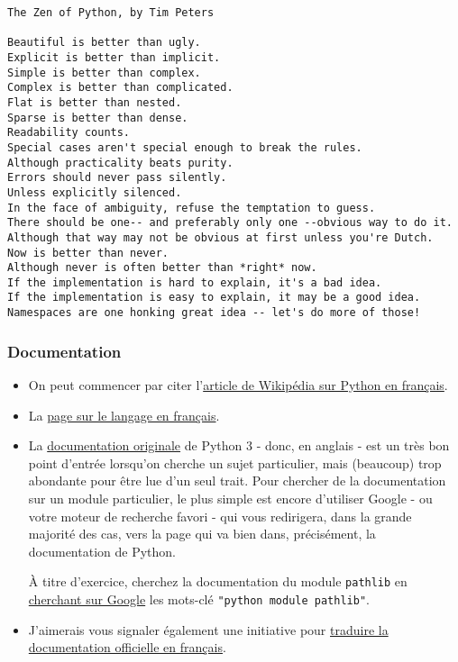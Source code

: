     \begin{Verbatim}[commandchars=\\\{\}]
The Zen of Python, by Tim Peters

Beautiful is better than ugly.
Explicit is better than implicit.
Simple is better than complex.
Complex is better than complicated.
Flat is better than nested.
Sparse is better than dense.
Readability counts.
Special cases aren't special enough to break the rules.
Although practicality beats purity.
Errors should never pass silently.
Unless explicitly silenced.
In the face of ambiguity, refuse the temptation to guess.
There should be one-- and preferably only one --obvious way to do it.
Although that way may not be obvious at first unless you're Dutch.
Now is better than never.
Although never is often better than *right* now.
If the implementation is hard to explain, it's a bad idea.
If the implementation is easy to explain, it may be a good idea.
Namespaces are one honking great idea -- let's do more of those!

    \end{Verbatim}

    \hypertarget{documentation}{%
\subsubsection{Documentation}\label{documentation}}

    \begin{itemize}
\item
  On peut commencer par citer
  l'\href{http://fr.wikipedia.org/wiki/Python_\%28langage\%29}{article
  de Wikipédia sur Python en français}.
\item
  La \href{https://wiki.python.org/moin/FrenchLanguage}{page sur le
  langage en français}.
\item
  La \href{https://docs.python.org/3/}{documentation originale} de
  Python 3 - donc, en anglais - est un très bon point d'entrée lorsqu'on
  cherche un sujet particulier, mais (beaucoup) trop abondante pour être
  lue d'un seul trait. Pour chercher de la documentation sur un module
  particulier, le plus simple est encore d'utiliser Google - ou votre
  moteur de recherche favori - qui vous redirigera, dans la grande
  majorité des cas, vers la page qui va bien dans, précisément, la
  documentation de Python.

  À titre d'exercice, cherchez la documentation du module
  \texttt{pathlib} en
  \href{https://www.google.fr/search?q=python+module+pathlib}{cherchant
  sur Google} les mots-clé \texttt{"python\ module\ pathlib"}.
\item
  J'aimerais vous signaler également une initiative pour
  \href{https://docs.python.org/fr/3/}{traduire la documentation
  officielle en français}.
\end{itemize}

